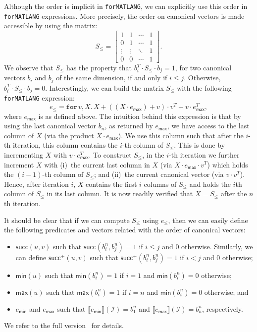 \documentclass[sigconf]{acmart}
\newcommand{\sem}[2]{\llbracket #1 \rrbracket(#2)}
\newcommand{\I}{\mathcal{I}}
\newcommand{\langfor}{\texttt{for}\text{-}\texttt{MATLANG}\xspace}
\newcommand{\ffor}[3]{\texttt{for}\, #1,#2 \texttt{.}\, #3}
\begin{document}
Although the order is implicit in \langfor, we can explicitly use this order in \langfor expressions. More precisely, the order on canonical vectors is made accessible by
using the matrix:
\[
S_{\leq} = \begin{bmatrix}
1 & 1 & \cdots &  1 \\
0 & 1 & \cdots & 1\\
\vdots & \vdots & \ddots & 1 \\
0 & 0 & \cdots & 1 
\end{bmatrix}.
\] 
We observe that $S_{\leq}$ has the property that $b_i^T\cdot S_{\leq} \cdot b_j=1$, for two canonical vectors $b_i$ and $b_j$ of the same dimension, if and only if $i\leq j$. Otherwise, $b_i^T\cdot S_{\leq} \cdot b_j=0$. 
Interestingly, we can build the matrix $S_{\leq}$ with the following \langfor expression:
$$
e_{\leq}=\ffor{v}{X}{X + \left((X\cdot e_{\mathsf{max}}) + v \right)\cdot v^T + v\cdot e^T_{\mathsf{max}}},
$$
where $e_{\mathsf{max}}$ is as defined above. The intuition behind this expression is that by using the last canonical vector $b_n$, as returned by $e_{\mathsf{max}}$, we have access to the last column of $X$ (via the product $X\cdot e_{\mathsf{max}}$). We use this column such that after the $i$-th iteration, this column contains the $i$-th column of $S_{\leq}$. This is done by incrementing $X$ with $v\cdot e_{\mathsf{max}}^T$.
To construct $S_{\leq}$, in the $i$-th iteration we further increment $X$ with 
(i)~the current last column in $X$ (via $X\cdot e_{\mathsf{max}}\cdot v^T$) which holds
the $(i-1)$-th column of $S_{\leq}$; and (ii)~the current canonical vector (via $v\cdot v^T$). Hence, after iteration $i$, $X$ contains the first $i$ columns of $S_{\leq}$ and holds the $i$th column of $S_{\leq}$ in its last column. It is now readily verified that $X=S_{\leq}$ after the $n$th iteration.

It should be clear that if we can compute $S_{\leq}$ using $e_{\leq}$, then we can easily define the following predicates and vectors related with the order of canonical vectors:
\begin{itemize}
	\item $\mathsf{succ}(u,v)$ such that $\mathsf{succ}(b_i^n,b_j^n)=1$ if $i\leq j$ and $0$ otherwise. Similarly, we can define
	$\mathsf{succ}^+(u,v)$ such that  $\mathsf{succ}^+(b_i^n,b_j^n)=1$ if $i < j$ and $0$ otherwise;
	\item $\mathsf{min}(u)$ such that  $\mathsf{min}(b_i^n)=1$ if $i=1$ and $\mathsf{min}(b_i^n)=0$ otherwise; 
	\item $\mathsf{max}(u)$ such that  $\mathsf{max}(b_i^n)=1$ if $i=n$ and $\mathsf{min}(b_i^n)=0$ otherwise; and
	\item $e_{\mathsf{min}}$ and $e_{\mathsf{max}}$ such that $\sem{e_{\mathsf{min}}}{\I}=b_1^n$ and 
	$\sem{e_{\mathsf{max}}}{\I}=b_n^n$, respectively.
\end{itemize}
We refer to the full version~\cite{geerts2020expressive} for details.
\end{document}
